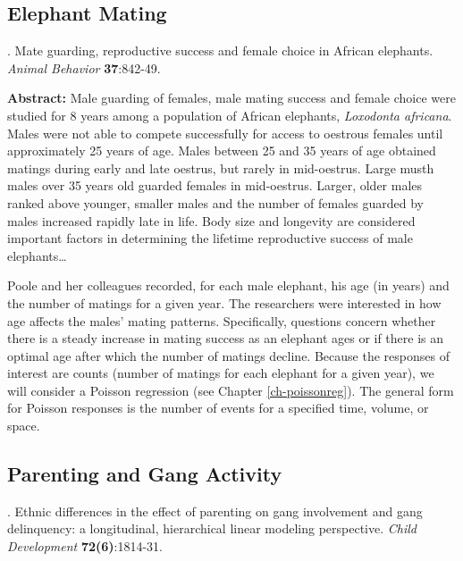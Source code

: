 \documentclass[
]{krantz}
\renewenvironment{quote}{\begin{VF}}{\end{VF}}
\begin{document}
\hypertarget{elephant-mating}{%
\subsection{Elephant Mating}\label{elephant-mating}}

\citet{Poole1989} . Mate guarding, reproductive success and female choice in African elephants. \emph{Animal Behavior} \textbf{37}:842-49.

\begin{quote}
\textbf{Abstract:} Male guarding of females, male mating success and female choice were studied for 8 years among a population of African elephants, \emph{Loxodonta africana}. Males were not able to compete successfully for access to oestrous females until approximately 25 years of age. Males between 25 and 35 years of age obtained matings during early and late oestrus, but rarely in mid-oestrus. Large musth males over 35 years old guarded females in mid-oestrus. Larger, older males ranked above younger, smaller males and the number of females guarded by males increased rapidly late in life. Body size and longevity are considered important factors in determining the lifetime reproductive success of male elephants\ldots{}
\end{quote}

Poole and her colleagues recorded, for each male elephant, his age (in years) and the number of matings for a given year. The researchers were interested in how age affects the males' mating patterns. Specifically, questions concern whether there is a steady increase in mating success as an elephant ages or if there is an optimal age after which the number of matings decline. Because the responses of interest are counts (number of matings for each elephant for a given year), we will consider a Poisson regression (see Chapter \ref{ch-poissonreg}). The general form for Poisson responses is the number of events for a specified time, volume, or space.

\hypertarget{parenting-and-gang-activity}{%
\subsection{Parenting and Gang Activity}\label{parenting-and-gang-activity}}

\citet{Walker-Barnes2001} . Ethnic differences in the effect of parenting on gang involvement and gang delinquency: a longitudinal, hierarchical linear modeling perspective. \emph{Child Development} \textbf{72(6)}:1814-31.
\end{document}
